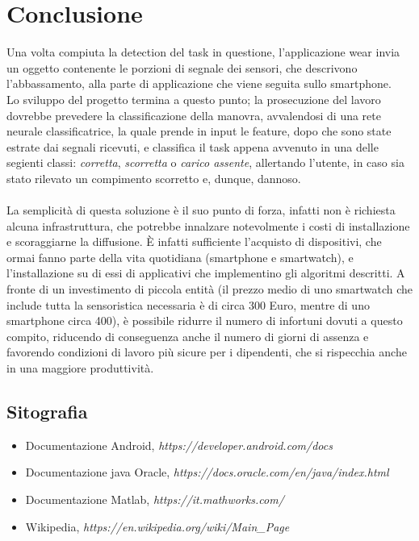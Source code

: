 \documentclass[a4paper, oneside]{book}
\begin{document}
	\chapter{Conclusione}
Una volta compiuta la detection del task in questione, l'applicazione wear invia un oggetto contenente le porzioni di segnale dei sensori, che descrivono l'abbassamento, alla parte di applicazione che viene seguita sullo smartphone. \\
Lo sviluppo del progetto termina a questo punto; la prosecuzione del lavoro dovrebbe prevedere la classificazione della manovra, avvalendosi di una rete neurale classificatrice, la quale prende in input le feature, dopo che sono state estrate dai segnali ricevuti, e classifica il task appena avvenuto in una delle segienti classi: \textit{corretta}, \textit{scorretta} o \textit{carico assente}, allertando l'utente, in caso sia stato rilevato un compimento scorretto e, dunque, dannoso. \\ \\
La semplicità di questa soluzione è il suo punto di forza, infatti non è richiesta alcuna infrastruttura, che potrebbe innalzare notevolmente i costi di installazione e scoraggiarne la diffusione. È infatti sufficiente l’acquisto di dispositivi, che ormai fanno parte della vita quotidiana (smartphone e smartwatch), e l’installazione su di essi di applicativi che implementino gli algoritmi descritti.
A fronte di un investimento di piccola entità (il prezzo medio di uno smartwatch che include tutta la sensoristica necessaria è di circa 300 Euro, mentre di uno smartphone circa 400), è possibile ridurre il numero di infortuni dovuti a questo compito, riducendo di conseguenza anche il numero di giorni di assenza e favorendo condizioni di lavoro più sicure per i dipendenti, che si rispecchia anche in una maggiore produttività.


\clearpage
	\section{Sitografia}

\begin{itemize}
\item Documentazione Android, \textit{https://developer.android.com/docs}
\item Documentazione java Oracle, \textit{https://docs.oracle.com/en/java/index.html}
\item Documentazione Matlab, \textit{https://it.mathworks.com/}
\item Wikipedia, \textit{https://en.wikipedia.org/wiki/Main\_Page}
\end{itemize}
\end{document}
